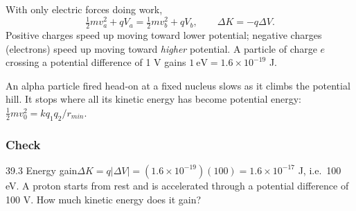 \documentclass[11pt]{article}
\begin{document}
With only electric forces doing work,
\[ \tfrac12 mv_a^2 + qV_a = \tfrac12 mv_b^2 + qV_b, \qquad \Delta K = -q\Delta V. \]
Positive charges speed up moving toward lower potential; negative charges (electrons) speed up moving toward \emph{higher} potential. A particle of charge $e$ crossing a potential difference of 1 V gains $1\ \mathrm{eV} = 1.6\times10^{-19}$ J.

\begin{example}
An alpha particle fired head-on at a fixed nucleus slows as it climbs the potential hill. It stops where all its kinetic energy has become potential energy: $\tfrac12 mv_0^2 = kq_1q_2/r_{min}$.
\end{example}

\subsubsection{Check}\mbox{}

\begin{q}{3}{9.3 Energy gain}{$\Delta K = q|\Delta V| = (1.6\times10^{-19})(100) = 1.6\times10^{-17}$ J, i.e.\ 100 eV.}
A proton starts from rest and is accelerated through a potential difference of 100 V. How much kinetic energy does it gain?
\end{q}

\makekey
\end{document}
